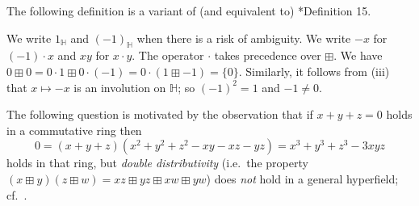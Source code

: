 \documentclass[reqno]{amsart}
\newtheorem{Ques}[Thm]{Question}
\theoremstyle{definition}
\newtheorem{Df}[Thm]{Definition}
\theoremstyle{remark}
\DeclareMathOperator{\deq}{\vcentcolon=}
\begin{document}
The following definition is a variant of (and equivalent to)
\cite{massouros26}*{Definition 15}.
We write $1_{\mathbb{H}}$ and $(-1)_{\mathbb{H}}$ when there is a risk of ambiguity.
We write $-x$ for $(-1)\cdot x$ and $xy$ for $x \cdot y$. The operator $\cdot$ takes precedence over $\boxplus$. 
We have $0 \boxplus 0 = 0\cdot 1 \boxplus 0\cdot (-1) = 0 \cdot (1 \boxplus -1) = \{0\}$.
Similarly, it follows from (iii) that $x \mapsto -x$ is an involution on $\mathbb{H}$; so $(-1)^2 = 1$ and $-1 \neq 0$.

The following question is motivated by the observation that if $x + y + z = 0$ holds in a commutative ring then
\[
    0 = (x + y + z)(x^2 + y^2 + z^2 - xy - xz - yz) = x^3 + y^3 + z^3 - 3xyz
\]
holds in that ring,
but \emph{double distributivity} 
(i.e.\ the property $(x \boxplus y)(z \boxplus w) = xz \boxplus yz \boxplus xw \boxplus yw$) does \emph{not} hold in a general hyperfield; cf.\ \cite{bowler21}.

\end{document}
